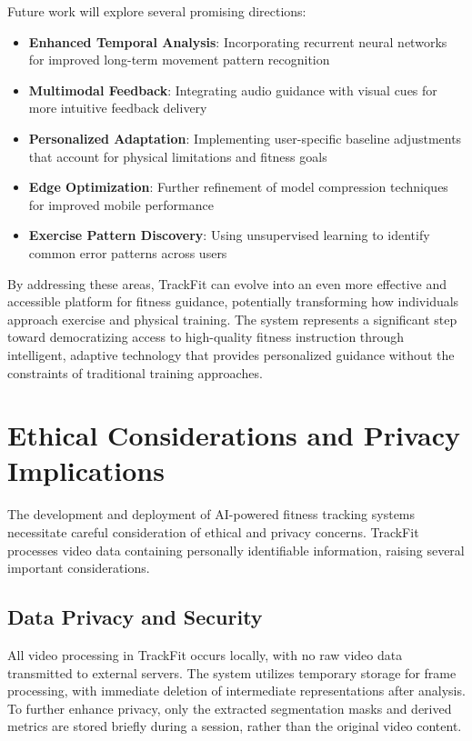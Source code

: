 \documentclass[conference]{IEEEtran}
\begin{document}
Future work will explore several promising directions:

\begin{itemize}
    \item \textbf{Enhanced Temporal Analysis}: Incorporating recurrent neural networks for improved long-term movement pattern recognition
    \item \textbf{Multimodal Feedback}: Integrating audio guidance with visual cues for more intuitive feedback delivery
    \item \textbf{Personalized Adaptation}: Implementing user-specific baseline adjustments that account for physical limitations and fitness goals
    \item \textbf{Edge Optimization}: Further refinement of model compression techniques for improved mobile performance
    \item \textbf{Exercise Pattern Discovery}: Using unsupervised learning to identify common error patterns across users
\end{itemize}

By addressing these areas, TrackFit can evolve into an even more effective and accessible platform for fitness guidance, potentially transforming how individuals approach exercise and physical training. The system represents a significant step toward democratizing access to high-quality fitness instruction through intelligent, adaptive technology that provides personalized guidance without the constraints of traditional training approaches.

\section{Ethical Considerations and Privacy Implications}
The development and deployment of AI-powered fitness tracking systems necessitate careful consideration of ethical and privacy concerns. TrackFit processes video data containing personally identifiable information, raising several important considerations.

\subsection{Data Privacy and Security}
All video processing in TrackFit occurs locally, with no raw video data transmitted to external servers. The system utilizes temporary storage for frame processing, with immediate deletion of intermediate representations after analysis. To further enhance privacy, only the extracted segmentation masks and derived metrics are stored briefly during a session, rather than the original video content.
\end{document}
